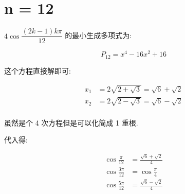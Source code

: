 \chapter{n = 12}\label{ch:cos12}

$4\cos\dfrac{(2k-1)kπ}{12}$ 的最小生成多项式为:

$$
P_{12} = x^4 - 16x^2 + 16
$$

这个方程直接解即可:

$$
\begin{aligned}
x_1&=2\sqrt{2+\sqrt{3}}=\sqrt{6}+\sqrt{2}\\
x_2&=2\sqrt{2-\sqrt{3}}=\sqrt{6}-\sqrt{2}\\
\end{aligned}
$$

虽然是个 4 次方程但是可以化简成 1 重根.

代入得:

$$
\begin{aligned}
\cos\frac{  π}{12}&=\frac{\sqrt{6}+\sqrt{2}}{4}\\
\cos\frac{3 π}{12}&=\cos\frac{π}{4}\\
\cos\frac{5 π}{12}&=\frac{\sqrt{6}-\sqrt{2}}{4}\\
\end{aligned}
$$